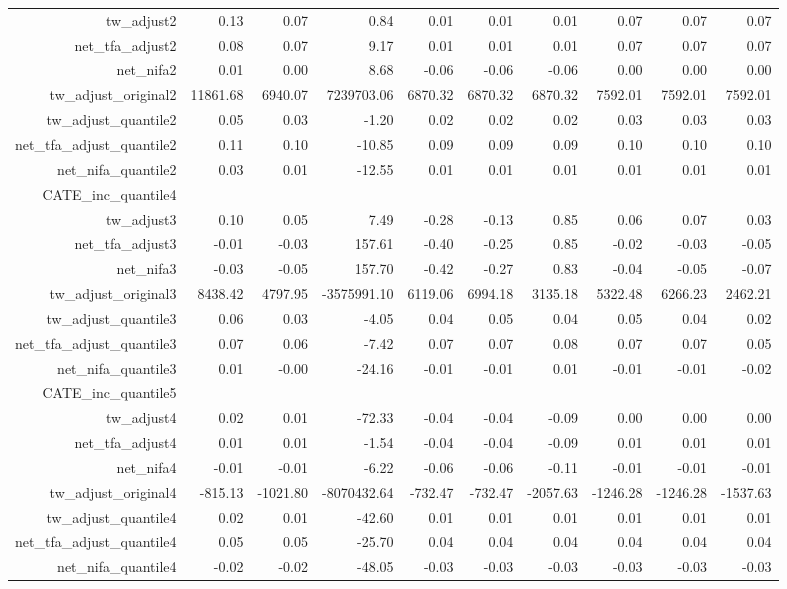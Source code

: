 \documentclass[10pt,a4paper]{article}
\begin{document}
\begin{landscape}
\begin{table}[ht]
\begin{tabular}{rrrrrrrrrr}
  tw\_adjust2 & 0.13 & 0.07 & 0.84 & 0.01 & 0.01 & 0.01 & 0.07 & 0.07 & 0.07 \\ 
  net\_tfa\_adjust2 & 0.08 & 0.07 & 9.17 & 0.01 & 0.01 & 0.01 & 0.07 & 0.07 & 0.07 \\ 
  net\_nifa2 & 0.01 & 0.00 & 8.68 & -0.06 & -0.06 & -0.06 & 0.00 & 0.00 & 0.00 \\ 
  tw\_adjust\_original2 & 11861.68 & 6940.07 & 7239703.06 & 6870.32 & 6870.32 & 6870.32 & 7592.01 & 7592.01 & 7592.01 \\ 
  tw\_adjust\_quantile2 & 0.05 & 0.03 & -1.20 & 0.02 & 0.02 & 0.02 & 0.03 & 0.03 & 0.03 \\ 
  net\_tfa\_adjust\_quantile2 & 0.11 & 0.10 & -10.85 & 0.09 & 0.09 & 0.09 & 0.10 & 0.10 & 0.10 \\ 
  net\_nifa\_quantile2 & 0.03 & 0.01 & -12.55 & 0.01 & 0.01 & 0.01 & 0.01 & 0.01 & 0.01 \\ 
  CATE\_inc\_quantile4 &  &  &  &  &  &  &  &  &  \\ 
  tw\_adjust3 & 0.10 & 0.05 & 7.49 & -0.28 & -0.13 & 0.85 & 0.06 & 0.07 & 0.03 \\ 
  net\_tfa\_adjust3 & -0.01 & -0.03 & 157.61 & -0.40 & -0.25 & 0.85 & -0.02 & -0.03 & -0.05 \\ 
  net\_nifa3 & -0.03 & -0.05 & 157.70 & -0.42 & -0.27 & 0.83 & -0.04 & -0.05 & -0.07 \\ 
  tw\_adjust\_original3 & 8438.42 & 4797.95 & -3575991.10 & 6119.06 & 6994.18 & 3135.18 & 5322.48 & 6266.23 & 2462.21 \\ 
  tw\_adjust\_quantile3 & 0.06 & 0.03 & -4.05 & 0.04 & 0.05 & 0.04 & 0.05 & 0.04 & 0.02 \\ 
  net\_tfa\_adjust\_quantile3 & 0.07 & 0.06 & -7.42 & 0.07 & 0.07 & 0.08 & 0.07 & 0.07 & 0.05 \\ 
  net\_nifa\_quantile3 & 0.01 & -0.00 & -24.16 & -0.01 & -0.01 & 0.01 & -0.01 & -0.01 & -0.02 \\ 
  CATE\_inc\_quantile5 &  &  &  &  &  &  &  &  &  \\ 
  tw\_adjust4 & 0.02 & 0.01 & -72.33 & -0.04 & -0.04 & -0.09 & 0.00 & 0.00 & 0.00 \\ 
  net\_tfa\_adjust4 & 0.01 & 0.01 & -1.54 & -0.04 & -0.04 & -0.09 & 0.01 & 0.01 & 0.01 \\ 
  net\_nifa4 & -0.01 & -0.01 & -6.22 & -0.06 & -0.06 & -0.11 & -0.01 & -0.01 & -0.01 \\ 
  tw\_adjust\_original4 & -815.13 & -1021.80 & -8070432.64 & -732.47 & -732.47 & -2057.63 & -1246.28 & -1246.28 & -1537.63 \\ 
  tw\_adjust\_quantile4 & 0.02 & 0.01 & -42.60 & 0.01 & 0.01 & 0.01 & 0.01 & 0.01 & 0.01 \\ 
  net\_tfa\_adjust\_quantile4 & 0.05 & 0.05 & -25.70 & 0.04 & 0.04 & 0.04 & 0.04 & 0.04 & 0.04 \\ 
  net\_nifa\_quantile4 & -0.02 & -0.02 & -48.05 & -0.03 & -0.03 & -0.03 & -0.03 & -0.03 & -0.03 \\ 
   \hline
\end{tabular}
\end{table}
\end{landscape}
\end{document}
